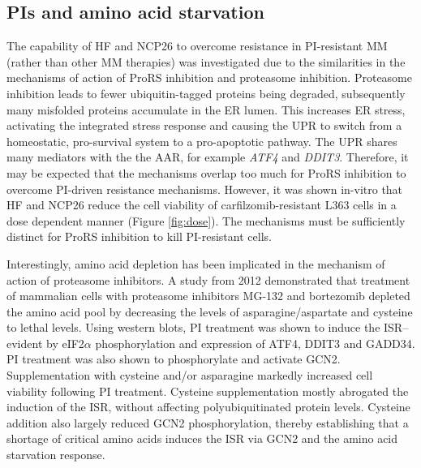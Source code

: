 \subsection{PIs and amino acid starvation}
The capability of HF and NCP26 to overcome resistance in PI-resistant MM (rather than other MM therapies) was investigated due to the similarities in the mechanisms of action of ProRS inhibition and proteasome inhibition.
Proteasome inhibition leads to fewer ubiquitin-tagged proteins being degraded, subsequently many misfolded proteins accumulate in the ER lumen.
This increases ER stress, activating the integrated stress response and causing the UPR to switch from a homeostatic, pro-survival system to a pro-apoptotic pathway\cite{kubiczkova2014proteasome, wallington2018resistance}.
The UPR shares many mediators with the the AAR, for example \textit{ATF4} and \textit{DDIT3}.
Therefore, it may be expected that the mechanisms overlap too much for ProRS inhibition to overcome PI-driven resistance mechanisms.
However, it was shown in-vitro that HF and NCP26 reduce the cell viability of carfilzomib-resistant L363 cells in a dose dependent manner (Figure \ref{fig:dose}).
The mechanisms must be sufficiently distinct for ProRS inhibition to kill PI-resistant cells.

Interestingly, amino acid depletion has been implicated in the mechanism of action of proteasome inhibitors\cite{suraweera2012failure}.
A study from 2012 demonstrated that treatment of mammalian cells with proteasome inhibitors MG-132 and bortezomib depleted the amino acid pool by decreasing the levels of asparagine/aspartate and cysteine to lethal levels\cite{suraweera2012failure}.
Using western blots, PI treatment was shown to induce the ISR-- evident by eIF2$\alpha$ phosphorylation and expression of ATF4, DDIT3 and GADD34.
PI treatment was also shown to phosphorylate and activate GCN2.
Supplementation with cysteine and/or asparagine markedly increased cell viability following PI treatment.
Cysteine supplementation mostly abrogated the induction of the ISR, without affecting polyubiquitinated protein levels.
Cysteine addition also largely reduced GCN2 phosphorylation, thereby establishing that a shortage of critical amino acids induces the ISR via GCN2 and the amino acid starvation response\cite{suraweera2012failure}.

